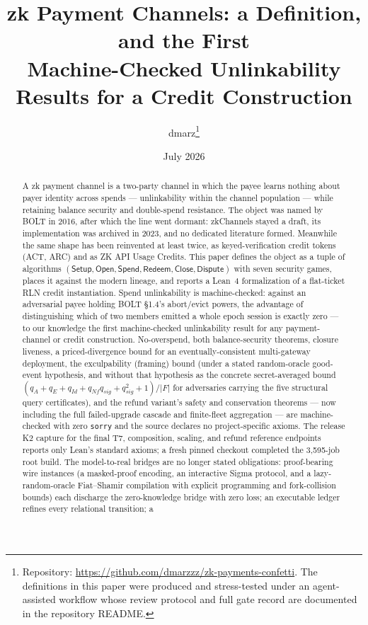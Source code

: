 \documentclass[9pt]{extarticle}
\title{zk Payment Channels: a Definition, and the First\\
Machine-Checked Unlinkability Results for a Credit Construction}
\author{dmarz\thanks{Repository: \url{https://github.com/dmarzzz/zk-payments-confetti}. The definitions in this paper were produced and stress-tested under an agent-assisted workflow whose review protocol and full gate record are documented in the repository README.}}
\date{July 2026}
\begin{document}
\maketitle

\begin{abstract}
A zk payment channel is a two-party channel in which the payee learns
nothing about payer identity across spends --- unlinkability within the
channel population --- while retaining balance security and double-spend
resistance. The object was named by BOLT in 2016, after which the line went
dormant: zkChannels stayed a draft, its implementation was archived in
2023, and no dedicated literature formed. Meanwhile the same shape has been
reinvented at least twice, as keyed-verification credit tokens (ACT, ARC)
and as ZK API Usage Credits. This paper defines the object as a tuple of
algorithms $(\mathsf{Setup}, \mathsf{Open}, \mathsf{Spend},
\mathsf{Redeem}, \mathsf{Close}, \mathsf{Dispute})$ with seven security
games, places it against the modern lineage, and reports a Lean~4
formalization of a flat-ticket RLN credit instantiation. Spend
unlinkability is machine-checked: against an adversarial payee holding
BOLT \S1.4's abort/evict powers, the advantage of distinguishing which of
two members emitted a whole epoch session is exactly zero --- to our
knowledge the first machine-checked unlinkability result for any
payment-channel or credit construction. No-overspend, both balance-security
theorems, closure liveness, a priced-divergence bound for an
eventually-consistent multi-gateway deployment, the exculpability (framing)
bound (under a stated random-oracle good-event hypothesis, and without that
hypothesis as the concrete secret-averaged bound
$(q_A+q_E+q_{Id}+q_{Nf}q_{sig}+q_{sig}^2+1)/|F|$ for adversaries carrying
the five structural query certificates), and the refund variant's safety and
conservation theorems --- now including the full failed-upgrade cascade and
finite-fleet aggregation --- are machine-checked with zero \texttt{sorry}
and the source declares no project-specific axioms. The release K2 capture
for the final T7, composition, scaling, and refund reference endpoints
reports only Lean's standard axioms; a fresh pinned checkout completed the
3,595-job root build. The model-to-real bridges
are no longer stated obligations: proof-bearing wire instances (a
masked-proof encoding, an interactive Sigma protocol, and a
lazy-random-oracle Fiat--Shamir compilation with explicit programming and
fork-collision bounds) each discharge the zero-knowledge bridge with zero
loss; an executable ledger refines every relational transition; a

\end{abstract}
\end{document}
